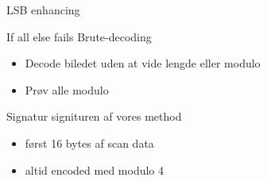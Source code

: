 \begin{frame}{LSB enhancing}
\begin{figure}
\centering
{}
\end{figure}
\end{frame}

\begin{frame}{If all else fails}
	Brute-decoding
		\begin{itemize}
		\item Decode biledet uden at vide lengde eller modulo
		\item Prøv alle modulo
		\end{itemize}
\end{frame}

\begin{frame}{Signatur}
	signituren af vores method
		\begin{itemize}
		\item først 16 bytes af scan data
		\item altid encoded med modulo 4
		\end{itemize}
\end{frame}